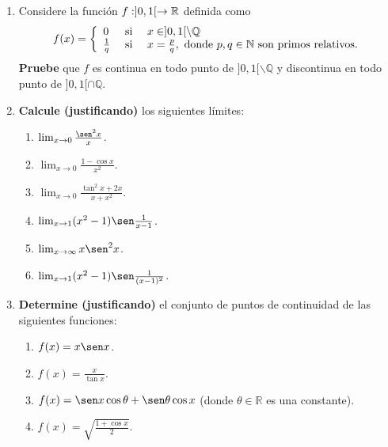 \documentclass[12pt]{article}
\begin{document}
\begin{enumerate}
    \item Considere la función $f:]0,1[\rightarrow\mathbb{R}$ definida como
    \begin{equation*}
        f(x)=\left\{\begin{array}{lcl}
            0 & \textup{ si } & x\in]0,1[\backslash\mathbb{Q}\\
            \frac{1}{q} & \textup{ si } & x=\frac{p}{q}, \textup{ donde }p,q\in\mathbb{N}\textup{ son primos relativos.}
        \end{array} \right.
    \end{equation*}
    \textbf{Pruebe} que $f$ es continua en todo punto de $]0,1[\backslash\mathbb{Q}$ y discontinua en todo punto de $]0,1[\cap\mathbb{Q}$.

    \item \textbf{Calcule (justificando)} los siguientes límites:
    \begin{enumerate}
        \item $\lim_{x\rightarrow0}\frac{\sen^2x}{x}$.
        \item $\lim_{x\rightarrow0}\frac{1-\cos x}{x^2}$.
        \item $\lim_{x\rightarrow0}\frac{\tan^2x+2x}{x+x^2}$.
        \item $\lim_{x\rightarrow1}(x^2-1)\sen\frac{1}{x-1}$.
        \item $\lim_{x\rightarrow\infty}x\sen^2x$.
        \item $\lim_{x\rightarrow1}(x^2-1)\sen\frac{1}{(x-1)^2}$.
    \end{enumerate}

    \item \textbf{Determine (justificando)} el conjunto de puntos de continuidad de las siguientes funciones:
    \begin{enumerate}
        \item $f(x)=x\sen x$.
        \item $f(x)=\frac{x}{\tan x}$.
        \item $f(x)=\sen x\cos\theta+\sen\theta\cos x$ (donde $\theta\in\mathbb{R}$ es una constante).
        \item $f(x)=\sqrt{\frac{1+\cos x}{2}}$.
    \end{enumerate}
    


\end{enumerate}
\end{document}
